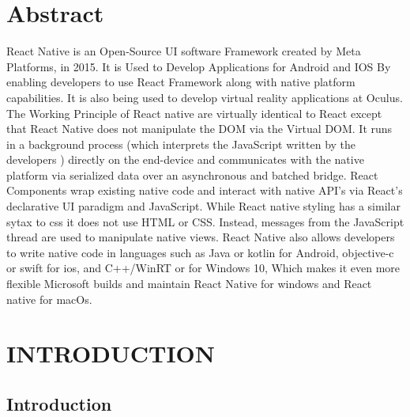 \documentclass[12pt,a4paper]{report}
\begin{document}
\newpage 
{}


\setlength{\headheight}{20pt}
 
\pagestyle{fancyplain}
\renewcommand{\chaptermark}[1]{\markboth{#1}{}}
 
\lhead{\fancyplain{}}
\chead{}
\rhead{\fancyplain{}{\textit{\leftmark}}}
\lfoot{}
\cfoot{\thepage}
\rfoot{}


\tableofcontents
\newpage

\chapter*{\centering Abstract}


React Native is an Open-Source UI software Framework created by Meta Platforms, in 2015. It is Used to Develop Applications for Android and IOS By enabling developers to use React Framework along with native platform capabilities. It is also being used to develop virtual reality applications at Oculus. The Working Principle of React native are virtually identical to React except that React Native does not manipulate the DOM via the Virtual DOM. It runs in a background process (which  interprets the JavaScript written by the developers ) directly on the end-device and communicates with the native platform via serialized data over an asynchronous and batched bridge. React Components wrap existing native code and interact with native API’s via React’s declarative UI paradigm and JavaScript. While React native styling has a similar sytax to css it does not use HTML or CSS. Instead, messages from the JavaScript thread are used to manipulate native views. React Native also allows developers to write native code in languages such as Java or kotlin for Android, objective-c or swift for ios, and C++/WinRT or  for Windows 10, Which makes it even more flexible Microsoft builds and maintain React Native for windows and React native for macOs.

\newpage

\chapter{INTRODUCTION}
\section{Introduction}
\end{document}
